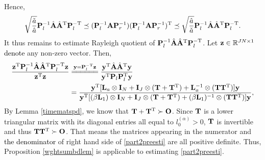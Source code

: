 \documentclass[11pt]{article}%
\numberwithin{equation}{section}
\newenvironment{proof}{\noindent{\bf Proof:}}{\hfill\fbox{}\vspace*{1mm}}
\begin{document}
\begin{proof}
	Hence,
	\begin{align}\label{part1esti}
	\sqrt{\frac{\check{a}}{\hat{a}}}{\bf P}_l^{-1}\hat{\bf A}\hat{\bf A}^{\rm T}{\bf P}_l^{-\rm T}\preceq({\bf P}_l^{-1}{\bf A}{\bf P}_r^{-1})({\bf P}_l^{-1}{\bf A}{\bf P}_r^{-1})^{\rm T}\preceq\sqrt{\frac{\hat{a}}{\check{a}}}{\bf P}_l^{-1}\hat{\bf A}\hat{\bf A}^{\rm T}{\bf P}_l^{-\rm T}.
	\end{align}
	It thus remains to estimate Rayleigh quotient of ${\bf P}_l^{-1}\hat{\bf A}\hat{\bf A}^{\rm T}{\bf P}_l^{-\rm T}$. Let ${\bf z}\in\mathbb{R}^{ J N\times 1}$ \textcolor{black}{denote} any non-zero vector. Then,
	\begin{align}
	\frac{{\bf z}^{\rm T}{\bf P}_l^{-1}\hat{\bf A}\hat{\bf A}^{\rm T}{\bf P}_l^{-\rm T}{\bf z}}{{\bf z}^{\rm T}{\bf z}}&\stackrel{{\bf y}={\bf P}_l^{-\rm T}{\bf z}}{=\joinrel=\joinrel=\joinrel=\joinrel=\joinrel=}\frac{{\bf y}^{\rm T}\hat{\bf A}\hat{\bf A}^{\rm T}{\bf y}}{{\bf y}^{\rm T}{\bf P}_l{\bf P}_l^{\rm T}{\bf y}}\notag\\
	&=\frac{{\bf y}^{\rm T}[{\bf L}_a\otimes{\bf I}_N+{\bf I}_{ J }\otimes({\bf T}+{\bf T}^{\rm T})+{\bf L}_a^{-1}\otimes({\bf T}{\bf T}^{\rm T})]{\bf y}}{{\bf y}^{\rm T}[(\beta{\bf L}_{1})\otimes{\bf I}_N+{\bf I}_{ J }\otimes({\bf T}+{\bf T}^{\rm T})+(\beta{\bf L}_{1})^{-1}\otimes({\bf T}{\bf T}^{\rm T})]{\bf y}},\label{part2preesti}
	\end{align}
	By Lemma \ref{timematspd}, we know that ${\bf T}+{\bf T}^{\rm T}\succ{\bf O}$. Since ${\bf T}$ is a lower triangular matrix with its diagonal entries all equal to $l_0^{(\alpha)}>0$, ${\bf T}$ is invertible and thus ${\bf T}{\bf T}^{\rm T}\succ{\bf O}$. That means the matrices appearing in the numerator and \textcolor{black}{the denominator} of right hand side of \eqref{part2preesti} are all positive definite. Thus, Proposition \ref{wghtsumbdlem} is applicable to estimating \eqref{part2preesti}.
	

\end{proof}
\end{document}
